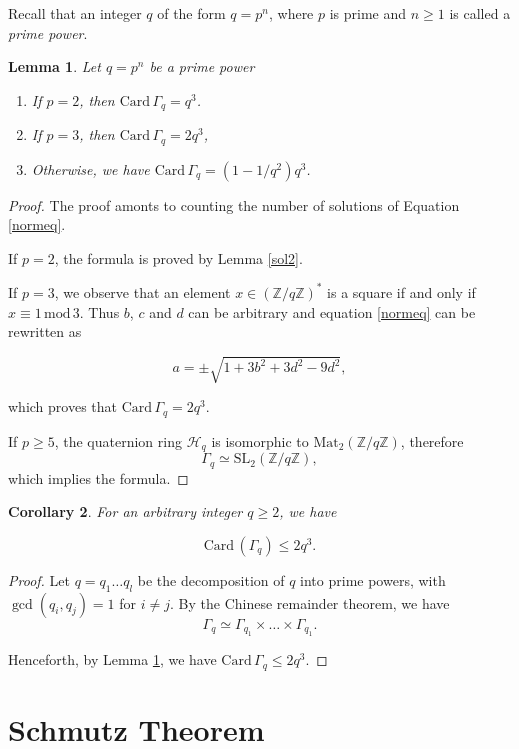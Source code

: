 \documentclass[10pt,a4paper]{amsart}
\newcommand{\Z}{\mathbb{Z}}
\newcommand{\Card}{\mathrm{Card\,}}
\newcommand{\Mat}{\mathrm{Mat}}
\newcommand{\SL}{{\mathrm {SL}}}
\renewcommand{\mod}{\,\mathrm{mod}\,}
\newtheorem{lemma}{Lemma}
\newtheorem{cor}[lemma]{Corollary}
\newcommand{\cH}{\mathcal{H}}
\begin{document}
Recall that an integer $q$ of the form $q=p^n$, where 
$p$ is prime and $n\geq 1$ is called a
{\it prime power}.


\begin{lemma}\label{solq} Let $q=p^n$ be a prime power

\begin{enumerate}
\item[(a)] If $p=2$, then $\Card \Gamma_q=q^3$.
\item[(b)] If $p=3$, then $\Card \Gamma_q=2q^3$,
\item[(c)] Otherwise, we have 
$\Card \Gamma_q=(1-1/q^2) q^3$.
\end{enumerate}

\end{lemma}


\begin{proof}  The proof amonts to counting 
the number of solutions of Equation \ref{normeq}.

If $p=2$, the formula is proved by Lemma \ref{sol2}.

If $p=3$, we observe that an element
$x\in (\Z/q\Z)^*$ is a square if and only if
$x\equiv 1\mod 3$. Thus $b$, $c$ and $d$ can be arbitrary
and equation
\ref{normeq}  can be rewritten as

$$a=\pm\sqrt{1+3b^2+3d^2-9d^2},$$

\noindent which proves that $\Card \Gamma_q=2q^3$.

If $p\geq 5$, the quaternion ring $\cH_q$ is isomorphic to
$\Mat_2(\Z/q\Z)$, therefore 
$$\Gamma_q\simeq \SL_2(\Z/q\Z),$$
which implies the formula.
\end{proof}

\begin{cor}\label{corcardinal} For an arbitrary integer $q\geq 2$, we have

$$\Card (\Gamma_q)\leq 2 q^3.$$
\end{cor}

\begin{proof} Let $q=q_1\ldots q_l$
be the decomposition of $q$ into prime powers, with
$\gcd(q_i,q_j)=1$ for $i\neq j$.
By the Chinese remainder theorem, we have
$$\Gamma_q\simeq \Gamma_{q_1}\times\ldots\times \Gamma_{q_1}.$$

\noindent Henceforth, by Lemma \ref{solq}, we have
$\Card  \Gamma_q\leq 2 q^3$. 
\end{proof}


\section{Schmutz Theorem}
\end{document}
